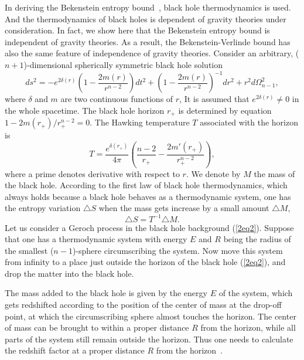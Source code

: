 \documentclass[a4paper,12pt]{article}
\begin{document}
In deriving the Bekenstein entropy bound~\cite{Beke,Bousso}, black hole thermodynamics is used.
And  the thermodynamics of black holes  is dependent of gravity
theories under consideration.  In fact, we show here that the Bekenstein entropy
bound is independent of gravity theories. As a result, the Bekenstein-Verlinde bound has also
the same feature of independence of gravity theories.  Consider an
arbitrary, ($n+1$)-dimensional spherically symmetric black hole solution
\begin{equation}
\label{2eq2}
ds^2 =- e^{2\delta (r)}\left (1-\frac{2m(r)}{r^{n-2}}\right) dt^2
       +\left( 1-\frac{2 m(r)}{r^{n-2}}\right)^{-1}dr^2 +r^2d\Omega_{n-1}^2,
\end{equation}
where $\delta $ and $m$ are two continuous functions of $r$, It is assumed that
$e^{2\delta (r)} \ne 0$ in the whole spacetime. The black hole
horizon $r_+$ is determined by equation $1 -2m(r_+)/r^{n-2}_+=0$. The Hawking
temperature $T$ associated with the horizon is
\begin{equation}
\label{2eq3}
T=\frac{e^{\delta(r_+)}}{4\pi}\left(\frac{n-2}{r_+}-
  \frac{2m'(r_+)}{r_+^{n-2}}\right),
\end{equation}
where a prime denotes derivative with respect to $r$.  We denote by $M$  the mass of
 the black hole. According to the first law of black hole thermodynamics, which always
 holds because a black hole behaves as a thermodynamic system, one
has the entropy variation $\triangle S$ when the mass gets increase by a small
 amount $\triangle M$,
\begin{equation}
\label{2eq4}
\triangle S = T^{-1}\triangle M.
\end{equation}
Let us consider a Geroch process in the black hole background (\ref{2eq2}).
Suppose that one has a thermodynamic system with energy $E$ and $R$ being the radius
of the smallest ($n-1$)-sphere circumscribing the system. Now move this system from
infinity to a place just outside the horizon of the black hole (\ref{2eq2}), and drop
the matter into the black hole.

The mass added to the black hole is given by the energy $E$ of the system, which gets
redshifted according to the position of the center of mass at the drop-off point, at
which the circumscribing sphere almost touches the horizon. The center of mass can be
brought to within a proper distance $R$ from the horizon, while all parts of the system
still remain outside the horizon. Thus one needs to calculate the redshift factor at a proper
distance $R$ from the horizon~\cite{Bousso}.
\end{document}
